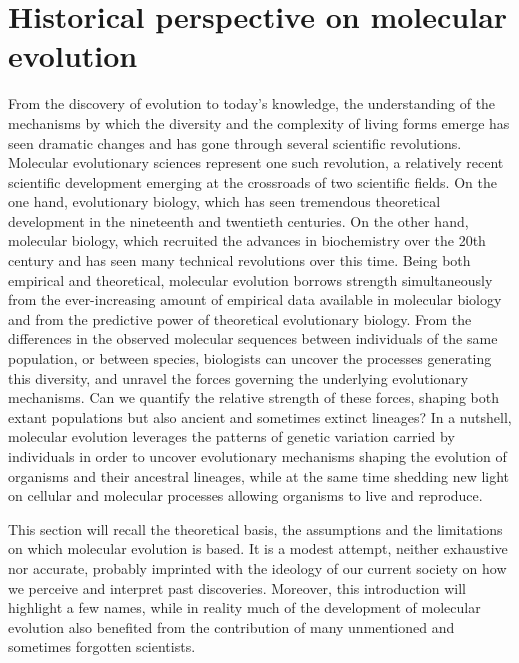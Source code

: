 \thispagestyle{empty}
\chapter{Historical perspective on molecular evolution}
{\hypersetup{linkcolor=GREYDARK}\minitoc}
\label{chap:intro-historical}

From the discovery of evolution to today's knowledge, the understanding of the mechanisms by which the diversity and the complexity of living forms emerge has seen dramatic changes and has gone through several scientific revolutions.
Molecular evolutionary sciences represent one such revolution, a relatively recent scientific development emerging at the crossroads of two scientific fields.
On the one hand, evolutionary biology, which has seen tremendous theoretical development in the nineteenth and twentieth centuries.
On the other hand, molecular biology, which recruited the advances in biochemistry over the 20th century and has seen many technical revolutions over this time.
Being both empirical and theoretical, molecular evolution borrows strength simultaneously from the ever-increasing amount of empirical data available in molecular biology and from the predictive power of theoretical evolutionary biology.
From the differences in the observed molecular sequences between individuals of the same population, or between species, biologists can uncover the processes generating this diversity, and unravel the forces governing the underlying evolutionary mechanisms.
Can we quantify the relative strength of these forces, shaping both extant populations but also ancient and sometimes extinct lineages?
In a nutshell, molecular evolution leverages the patterns of genetic variation carried by individuals in order to uncover evolutionary mechanisms shaping the evolution of organisms and their ancestral lineages, while at the same time shedding new light on cellular and molecular processes allowing organisms to live and reproduce.

This section will recall the theoretical basis, the assumptions and the limitations on which molecular evolution is based.
It is a modest attempt, neither exhaustive nor accurate, probably imprinted with the ideology of our current society on how we perceive and interpret past discoveries.
Moreover, this introduction will highlight a few names, while in reality much of the development of molecular evolution also benefited from the contribution of many unmentioned and sometimes forgotten scientists.


